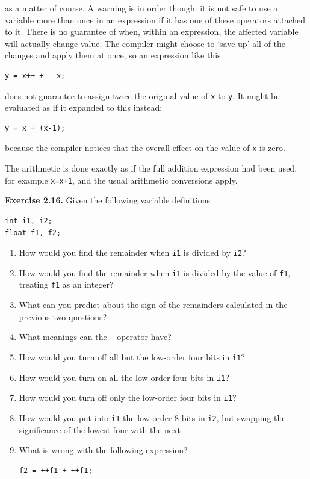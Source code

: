     as a matter of course. A warning is in order though: it is not safe to
     use a variable more than once in an expression if it has one of these
     operators attached to it. There is no guarantee of when, within an
     expression, the affected variable will actually change value. The
     compiler might choose to `save up' all of the changes and apply
     them at once, so an expression like this


    \begin{Verbatim}
y = x++ + --x;
\end{Verbatim}

    does not guarantee to assign twice the original value
     of \texttt{x} to \texttt{y}. It might be evaluated as
     if it expanded to this instead:


    \begin{Verbatim}
y = x + (x-1);
\end{Verbatim}

    because the compiler notices that the overall effect on the value
     of \texttt{x} is zero.


    The arithmetic is done exactly as if the full addition expression had
     been used, for example \texttt{x=x+1}, and the usual arithmetic
     conversions apply.


   

   

    \textbf{Exercise 2.16.} Given the following variable definitions

\begin{Verbatim}
int i1, i2;
float f1, f2;
\end{Verbatim}
\begin{enumerate}
      \item How would you find the remainder when \texttt{i1} is
       divided by \texttt{i2}?
      \item How would you find the remainder when \texttt{i1} is
       divided by the value of \texttt{f1},
       treating \texttt{f1} as an integer?
      \item What can you predict about the sign of the remainders calculated in
       the previous two questions?
      \item What meanings can the \texttt{-} operator have?
      \item How would you turn off all but the low-order four bits
       in \texttt{i1}?
      \item How would you turn on all the low-order four bits
       in \texttt{i1}?
      \item How would you turn off only the low-order four bits
       in \texttt{i1}?
      \item How would you put into \texttt{i1} the low-order
       8 bits in \texttt{i2}, but swapping the significance of
       the lowest four with the next
      \item What is wrong with the following expression?
       \begin{Verbatim}
f2 = ++f1 + ++f1;
\end{Verbatim}

      
     \end{enumerate}

